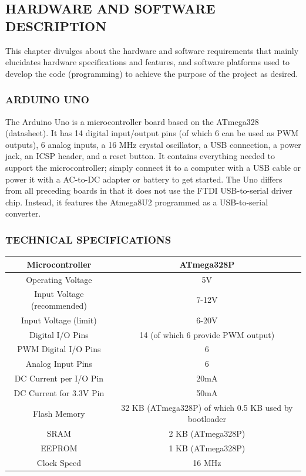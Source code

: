 \documentclass[12pt]{extarticle}
\numberwithin{figure}{section}
\begin{document}


\newpage
\begin{center}
\section{HARDWARE AND SOFTWARE DESCRIPTION}
\end{center}
This chapter divulges about the hardware and software requirements that mainly elucidates hardware specifications and features, and software platforms used to develop the code (programming) to achieve the purpose of the project as desired. 
\subsubsection{ARDUINO UNO}
The Arduino Uno is a microcontroller board based on the ATmega328 (datasheet). It has 14 digital input/output pins (of which 6 can be used as PWM outputs), 6 analog inputs, a 16 MHz crystal oscillator, a USB connection, a power jack, an ICSP header, and a reset button. It contains everything needed to support the microcontroller; simply connect it to a computer with a USB cable or power it with a AC-to-DC adapter or battery to get started. The Uno differs from all preceding boards in that it does not use the FTDI USB-to-serial driver chip. Instead, it features the Atmega8U2 programmed as a USB-to-serial converter. 
\subsubsection{TECHNICAL SPECIFICATIONS}
\begin{tabular}{ |c|c| }
\hline
Microcontroller & ATmega328P\\
\hline
Operating Voltage & 5V\\
\hline
Input Voltage (recommended) & 7-12V\\
\hline
Input Voltage (limit) & 6-20V\\
\hline
Digital I/O Pins & 14 (of which 6 provide PWM output)\\
\hline
PWM Digital I/O Pins & 6\\
\hline
Analog Input Pins & 6\\
\hline
DC Current per I/O Pin & 20mA\\
\hline
DC Current for 3.3V Pin & 50mA\\
\hline
Flash Memory & 32 KB (ATmega328P)
of which 0.5 KB used by bootloader\\
\hline
SRAM & 2 KB (ATmega328P)\\
\hline
EEPROM & 1 KB (ATmega328P)\\
\hline
Clock Speed & 16 MHz\\
\hline
\end{tabular}
\end{document}
